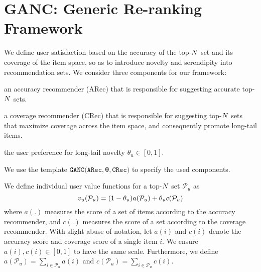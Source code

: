 \iffalse
The  motivation for this is two-fold. First, as shown in most recommenders that focus only on accuracy, has low coverage and tend to recommend popular items that the users is likely already aware of. By considering coverage, we promote long-tail items into recommendation sets and consequently introduce novelty and serendiptiy into recommendation sets, and allow users to discover items they were not aware of~\cite{cremonesi2010performance, jambor2010optimizing, yin2012challenging}. This is satisfactory for the consumers, particularly for those with  niche tastes. Second,  long-tail item promotion results in item inventory exposure, and helps spread the demand more evenly between the hits and niche items. This is  satisfactory for the producer~\cite{azaria2013movie,vargas2014improving}.  However, it is essential to promote long-tail items in a targeted manner. 
\fi
\section{GANC: Generic Re-ranking Framework}
\label{sec:RiskbasedReranking} 
We define user satisfaction  based on the accuracy of the top-$N$ set and its coverage of the item space, so as to introduce novelty and serendipity into recommendation sets.   %
We consider three components for our framework: \begin{enumerate*}
\item an accuracy recommender (ARec) that is responsible for suggesting accurate top-$N$ sets. 
\item a coverage recommender (CRec)  that is responsible for  suggesting top-$N$ sets that maximize coverage across the item space, and consequently promote long-tail items. 
\item the user preference for long-tail novelty  $\theta_u \in [0,1]$. 
\end{enumerate*} 
We use the template $\texttt{GANC} (\texttt{ARec}, \bm{\theta}, \texttt{CRec)}$ to specify the used components. 

We define individual user value functions  for a top-$N $ set $\mathcal{P}_u$  as%
\begin{equation} 
\small
v_u(\mathcal{P}_u) =  (1-\theta_u) a(\mathcal{P}_{u})  + \theta_{u} c(\mathcal{P}_{u})  \label{eq:vurelcov}
\end{equation}
where  $a(.)$  measures the score of a set of items according to the accuracy recommender, and $c(.)$  measures the score of a set according to the coverage recommender. With slight abuse of notation, let $a(i)$ and  $c(i)$ denote the accuracy score and  coverage score  of a single item $i$. We ensure $a(i), c(i) \in [0,1]$ to have the same scale. Furthermore, we define  $a(\mathcal{P}_u) = \sum_{i \in \mathcal{P}_u} a(i) $ and $c(\mathcal{P}_u) = \sum_{i \in \mathcal{P}_u} c(i) $.

